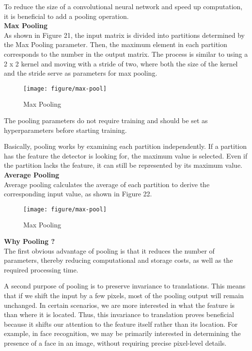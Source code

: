 \documentclass{article}
\begin{document}
To reduce the size of a convolutional neural network and speed up computation, it is beneficial to add a pooling operation.\\

\noindent
\textbf{Max Pooling}\\
\noindent
As shown in Figure 21, the input matrix is divided into partitions determined by the Max Pooling parameter. Then, the maximum element in each partition corresponds to the number in the output matrix. The process is similar to using a 2 x 2 kernel and moving with a stride of two, where both the size of the kernel and the stride serve as parameters for max pooling.


\begin{figure}[htbp]
        \centering
        \texttt{[image: figure/max-pool]}
        \caption{Max Pooling}
     \end{figure}

The pooling parameters do not require training and should be set as hyperparameters before starting training.

Basically, pooling works by examining each partition independently. If a partition has the feature the detector is looking for, the maximum value is selected. Even if the partition lacks the feature, it can still be represented by its maximum value.\\


\noindent
\textbf{Average Pooling}\\
\noindent
Average pooling calculates the average of each partition to derive the corresponding input value, as shown in Figure 22.


\begin{figure}[htbp]
        \centering
        \texttt{[image: figure/max-pool]}
        \caption{Max Pooling}
     \end{figure}


\noindent
\textbf{Why Pooling ? }\\
\noindent
The first obvious advantage of pooling is that it reduces the number of parameters, thereby reducing computational and storage costs, as well as the required processing time.

A second purpose of pooling is to preserve invariance to translations. This means that if we shift the input by a few pixels, most of the pooling output will remain unchanged. In certain scenarios, we are more interested in what the feature is than where it is located. Thus, this invariance to translation proves beneficial because it shifts our attention to the feature itself rather than its location. For example, in face recognition, we may be primarily interested in determining the presence of a face in an image, without requiring precise pixel-level details.
\end{document}
